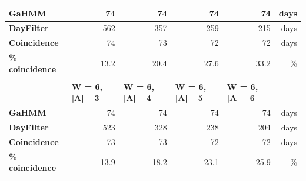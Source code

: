\begin{table}[htbp]
\begin{tabular}{|l|r|r|r|r|r|}
    \hline
    \textbf{GaHMM} & 74   & 74   & 74   & 74   & days \bigstrut\\
    \hline
    \textbf{DayFilter} & 562  & 357  & 259  & 215  & days \bigstrut\\
    \hline
    \textbf{Coincidence} & 74   & 73   & 72   & 72   & days \bigstrut\\
    \hline
    \textbf{\% coincidence} & \cellcolor[rgb]{ .973,  .412,  .42} 13.2 & \cellcolor[rgb]{ .98,  .584,  .451} 20.4 & \cellcolor[rgb]{ .988,  .757,  .482} 27.6 & \cellcolor[rgb]{ .996,  .89,  .51} 33.2 & \% \bigstrut\\
    \hline
    \multicolumn{1}{r}{} & \multicolumn{1}{r}{} & \multicolumn{1}{r}{} & \multicolumn{1}{r}{} & \multicolumn{1}{r}{} & \multicolumn{1}{r}{} \bigstrut\\
    \hline
         & \multicolumn{1}{l|}{\textbf{W = 6, |A|= 3}} & \multicolumn{1}{l|}{\textbf{W = 6, |A|= 4}} & \multicolumn{1}{l|}{\textbf{W = 6, |A|= 5}} & \multicolumn{1}{l|}{\textbf{W = 6, |A|= 6}} &  \bigstrut\\
    \hline
    \textbf{GaHMM} & 74   & 74   & 74   & 74   & days \bigstrut\\
    \hline
    \textbf{DayFilter} & 523  & 328  & 238  & 204  & days \bigstrut\\
    \hline
    \textbf{Coincidence} & 73   & 73   & 72   & 72   & days \bigstrut\\
    \hline
    \textbf{\% coincidence} & \cellcolor[rgb]{ .973,  .427,  .42} 13.9 & \cellcolor[rgb]{ .976,  .529,  .439} 18.2 & \cellcolor[rgb]{ .984,  .647,  .463} 23.1 & \cellcolor[rgb]{ .988,  .714,  .475} 25.9 & \% \bigstrut\\
    \hline
    \end{tabular}%
  \label{tab:SAXvsGaHMM_all}%
\end{table}%








